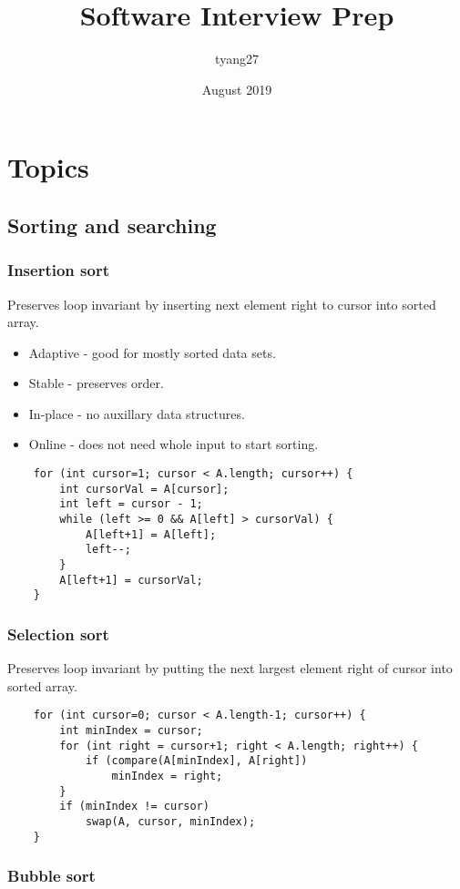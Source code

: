 \documentclass{article}
\title{Software Interview Prep}
\author{tyang27}
\date{August 2019}
\begin{document}
\maketitle

\section{Topics}
\subsection{Sorting and searching}
\subsubsection{Insertion sort}
Preserves loop invariant by inserting next element right to cursor into sorted array.
\begin{itemize}
    \item Adaptive - good for mostly sorted data sets.
    \item Stable - preserves order.
    \item In-place - no auxillary data structures.
    \item Online - does not need whole input to start sorting.
\end{itemize}
\begin{verbatim}
    for (int cursor=1; cursor < A.length; cursor++) {
        int cursorVal = A[cursor];
        int left = cursor - 1;
        while (left >= 0 && A[left] > cursorVal) {
            A[left+1] = A[left];
            left--;
        }
        A[left+1] = cursorVal;
    }
\end{verbatim}

\subsubsection{Selection sort}
Preserves loop invariant by putting the next largest element right of cursor into sorted array.
\begin{verbatim}
    for (int cursor=0; cursor < A.length-1; cursor++) {
        int minIndex = cursor;
        for (int right = cursor+1; right < A.length; right++) {
            if (compare(A[minIndex], A[right])
                minIndex = right;
        }
        if (minIndex != cursor)
            swap(A, cursor, minIndex);
    }
\end{verbatim}


\subsubsection{Bubble sort}
\end{document}
